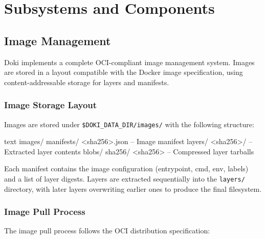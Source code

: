 \chapter{Subsystems and Components}
\label{ch:components}

\section{Image Management}
\label{sec:image-management}

Doki implements a complete OCI-compliant image management system. Images
are stored in a layout compatible with the Docker image specification,
using content-addressable storage for layers and manifests.

\subsection{Image Storage Layout}
\label{sec:image-layout}

Images are stored under \texttt{\$DOKI\_DATA\_DIR/images/} with the
following structure:

\begin{codebox}[title={Image storage directory layout}]{text}
images/
  manifests/
    <sha256>.json          -- Image manifest
  layers/
    <sha256>/              -- Extracted layer contents
  blobs/
    sha256/
      <sha256>             -- Compressed layer tarballs
\end{codebox}

Each manifest contains the image configuration (entrypoint, cmd, env,
labels) and a list of layer digests. Layers are extracted sequentially
into the \texttt{layers/} directory, with later layers overwriting
earlier ones to produce the final filesystem.

\subsection{Image Pull Process}
\label{sec:image-pull}

The image pull process follows the OCI distribution specification:

